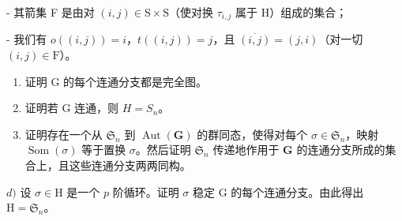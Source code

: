 - 其箭集 F 是由对 \((i,j)\in\mathrm{S}\times\mathrm{S}\)（使对换 \(\tau_{i,j}\) 属于 H）组成的集合；

- 我们有 \(o((i,j)) = i\)，\(t((i,j)) = j\)，且 \(\overline{(i,j)} = (j,i)\)（对一切 \((i,j) \in \mathrm{F}\)）。

\begin{enumerate}
\def\labelenumi{\alph{enumi})}
\item
  证明 G 的每个连通分支都是完全图。
\item
  证明若 G 连通，则 \(H = S_{n}\)。
\item
  证明存在一个从 \(\mathfrak{S}_n\) 到 \(\operatorname{Aut}(\mathbf{G})\) 的群同态，使得对每个 \(\sigma \in \mathfrak{S}_n\)，映射 \(\operatorname{Som}(\sigma)\) 等于置换 \(\sigma\)。然后证明 \(\mathfrak{S}_n\) 传递地作用于 \(\mathbf{G}\) 的连通分支所成的集合上，且这些连通分支两两同构。
\end{enumerate}

\(d)\) 设 \(\sigma\in\mathrm{H}\) 是一个 \(p\) 阶循环。证明 \(\sigma\) 稳定 G 的每个连通分支。由此得出 \(\mathrm{H}=\mathfrak{S}_{n}\)。

